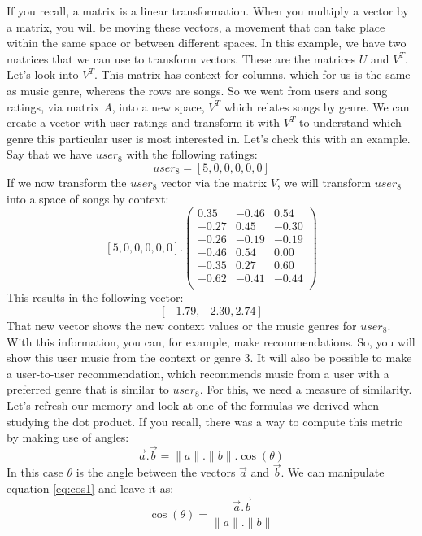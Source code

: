 \documentclass[a4,12pt,twosided,openany]{memoir}
\begin{document}
If you recall, a matrix is a linear transformation. When you multiply a vector by a matrix, you will be moving these vectors, a movement that can take place within the same space or between different spaces. In this example, we have two matrices that we can use to transform vectors. These are the matrices $U$ and $V^T$. Let’s look into $V^T$. This matrix has context for columns, which for us is the same as music genre, whereas the rows are songs. So we went from users and song ratings, via matrix $A$, into a new space, $V^T$ which relates songs by genre. We can create a vector with user ratings and transform it with $V^T$ to understand which genre this particular user is most interested in. Let’s check this with an example. Say that we have $user_8$ with the following ratings:
\[user_8 = \left[5,0,0,0,0,0 \right] \]
\indent If we now transform the $user_8$  vector via the matrix $V$, we will transform $user_8$ into a space of songs by context:
\[
\left[5,0,0,0,0,0 \right] . \begin{pmatrix}
  0.35  & -0.46  & 0.54 \\
  -0.27 & 0.45  & -0.30 \\
  -0.26 & -0.19 & -0.19 \\
  -0.46 &0.54 &0.00 \\ 
  -0.35 &0.27 &0.60\\
  -0.62 &-0.41  &-0.44\\
\end{pmatrix}
\]
\indent This results in the following vector:
\[\left[-1.79, -2.30,  2.74 \right]\]
\indent That new vector shows the new context values or the music genres for $user_8$. With this information, you can, for example, make recommendations. So, you will show this user music from the context or genre 3. It will also be possible to make a user-to-user recommendation, which recommends music from a user with a preferred genre that is similar to $user_8$. For this, we need a measure of similarity. Let’s refresh our memory and look at one of the formulas we derived when studying the dot product. If you recall, there was a way to compute this metric by making use of angles:
\begin{equation}
\overrightarrow{a}.\overrightarrow{b} = \lVert a \rVert .\lVert b \rVert.\cos(\theta) \label{eq:cos1}
\end{equation}
\indent In this case $\theta$ is the angle between the vectors $\overrightarrow{a}$ and $\overrightarrow{b}$. We can manipulate equation \ref{eq:cos1} and leave it as:
\begin{equation}\label{eq:cosd}
\cos(\theta) = \frac{\overrightarrow{a}.\overrightarrow{b}}{ \lVert a \rVert .\lVert b \rVert}
\end{equation}
\end{document}
